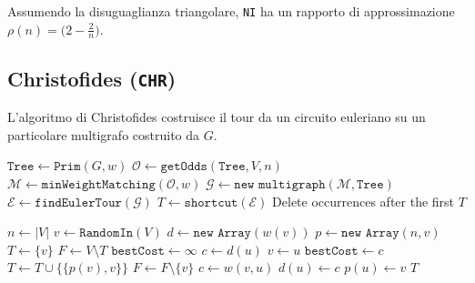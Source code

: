 Assumendo la disuguaglianza triangolare, \texttt{NI} ha un rapporto di approssimazione 
$\rho(n) = \big(2-\frac{2}{n}\big)$\cite{STSP}.
\ \\

\subsection{Christofides (\texttt{CHR})}

L'algoritmo di Christofides costruisce il tour da un circuito euleriano
su un particolare multigrafo costruito da $G$.\\

\begin{algorithm}[H]
\caption{}
\begin{algorithmic}[1]
    \State $\texttt{Tree} \gets \texttt{Prim}(G,w)$
    \State $\mathcal{O} \gets \texttt{getOdds}(\texttt{Tree}, V, n)$
    \State $\mathcal{M} \gets \texttt{minWeightMatching}(\mathcal{O},w)$
    \State $\mathcal{G} \gets \texttt{new multigraph}(\mathcal{M}, \texttt{Tree})$
    \State $\mathcal{E} \gets \texttt{findEulerTour}(\mathcal{G})$
    \State $T \gets \texttt{shortcut}(\mathcal{E})$ \Comment Delete occurrences after the first
    \State
    \State \Return $T$
\EndFunction
\end{algorithmic}
\end{algorithm}

\begin{algorithm}[H]
\caption{}
\begin{algorithmic}[1]
    \State $n \gets |V|$
    \State $v \gets \texttt{RandomIn}(V)$
    \State $d \gets \texttt{new Array}(w(v))$
    \State $p \gets \texttt{new Array}(n, v)$
    \State $T \gets \{v\}$
    \State $F \gets V \setminus T$
    \State
        \State $\texttt{bestCost} \gets \infty$
            \State $c \gets d(u)$
                \State $v \gets u$
                \State $\texttt{bestCost} \gets c$
            \EndIf
        \EndFor
        \State
        \State $T \gets T \cup \big\{ \{p(v),v\} \big\}$
        \State $F \gets F \setminus \{v\}$
            \State $c \gets w(v,u)$
                \State $d(u) \gets c$
                \State $p(u) \gets v$
            \EndIf
        \EndFor
    \EndFor
    \State
    \State \Return $T$
\EndFunction
\end{algorithmic}
\end{algorithm}


